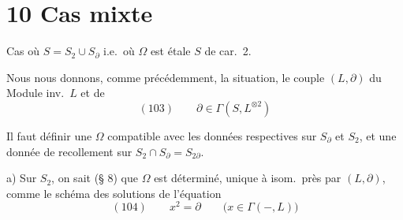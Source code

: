 \documentclass[11pt,a4paper]{article}
\begin{document}
\section{10 \quad Cas mixte}

 Cas où $S = S_2 \cup S_{\partial}$
i.e.\ où $\Omega$ est étale    
$S$ de car.\ 2.


Nous nous donnons, comme précédemment,  la situation,
le couple $(L, \partial)$ du Module inv.\ $L$ et de
\[
(103)\qquad \partial \in \Gamma(S, L^{\otimes 2})
\]

Il faut définir une $\Omega$ compatible avec les données respectives sur
$S_{\partial}$ et $S_2$, et  une donnée de recollement sur
$S_2 \cap S_{\partial} = S_{2\partial}$.

a) Sur $S_2$, on sait (§ 8) que $\Omega$ est déterminé,
unique à isom.\ près par $(L, \partial)$, comme
le schéma des solutions de l'équation
\[
(104)\qquad x^2 = \partial \qquad \bigl(x \in \Gamma(-, L)\bigr)
\]
\end{document}
